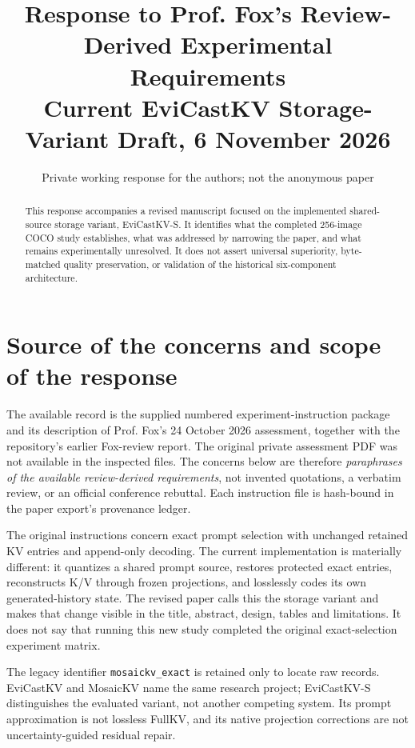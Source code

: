 \documentclass[11pt]{article}
\title{Response to Prof. Fox's Review-Derived Experimental Requirements\\
\large Current EviCastKV Storage-Variant Draft, 6 November 2026}
\author{Private working response for the authors; not the anonymous paper}
\date{}
\begin{document}
\maketitle
\begin{abstract}
This response accompanies a revised manuscript focused on the implemented
shared-source storage variant, EviCastKV-S. It identifies what the completed
256-image COCO study establishes, what was addressed by narrowing the
paper, and what remains experimentally unresolved. It does not assert
universal superiority, byte-matched quality preservation, or validation of
the historical six-component architecture.
\end{abstract}

\section{Source of the concerns and scope of the response}
The available record is the supplied numbered experiment-instruction
package and its description of Prof. Fox's 24 October 2026 assessment,
together with the repository's earlier Fox-review report. The original
private assessment PDF was not available in the inspected files. The
concerns below are therefore \emph{paraphrases of the available
review-derived requirements}, not invented quotations, a verbatim review,
or an official conference rebuttal. Each instruction file is hash-bound
in the paper export's provenance ledger.

The original instructions concern exact prompt selection with unchanged
retained KV entries and append-only decoding. The current implementation
is materially different: it quantizes a shared prompt source, restores
protected exact entries, reconstructs K/V through frozen projections, and
losslessly codes its own generated-history state. The revised paper calls
this the storage variant and makes that change visible in the title,
abstract, design, tables and limitations. It does not say that running
this new study completed the original exact-selection experiment matrix.

The legacy identifier \texttt{mosaickv\_exact} is retained only to locate
raw records. EviCastKV and MosaicKV name the same research project;
EviCastKV-S distinguishes the evaluated variant, not another competing
system. Its prompt approximation is not lossless FullKV, and its native
projection corrections are not uncertainty-guided residual repair.
\end{document}
